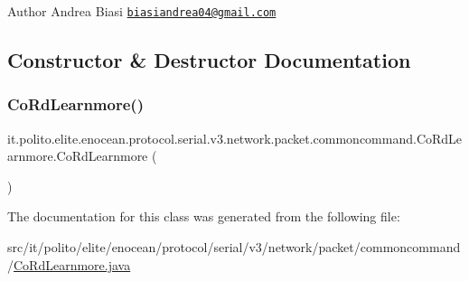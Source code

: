 \begin{DoxyAuthor}{Author}
Andrea Biasi \href{mailto:biasiandrea04@gmail.com}{\tt biasiandrea04@gmail.\+com} 
\end{DoxyAuthor}


\subsection{Constructor \& Destructor Documentation}
\hypertarget{classit_1_1polito_1_1elite_1_1enocean_1_1protocol_1_1serial_1_1v3_1_1network_1_1packet_1_1commoncommand_1_1_co_rd_learnmore_aa99c5ab55bdfdc9e42300e6cc22e6fa6}{}\label{classit_1_1polito_1_1elite_1_1enocean_1_1protocol_1_1serial_1_1v3_1_1network_1_1packet_1_1commoncommand_1_1_co_rd_learnmore_aa99c5ab55bdfdc9e42300e6cc22e6fa6} 
\subsubsection{\texorpdfstring{Co\+Rd\+Learnmore()}{CoRdLearnmore()}}
{\footnotesize\ttfamily it.\+polito.\+elite.\+enocean.\+protocol.\+serial.\+v3.\+network.\+packet.\+commoncommand.\+Co\+Rd\+Learnmore.\+Co\+Rd\+Learnmore (\begin{DoxyParamCaption}{ }\end{DoxyParamCaption})}



The documentation for this class was generated from the following file\+:\begin{DoxyCompactItemize}
\item 
src/it/polito/elite/enocean/protocol/serial/v3/network/packet/commoncommand/\hyperlink{_co_rd_learnmore_8java}{Co\+Rd\+Learnmore.\+java}\end{DoxyCompactItemize}
